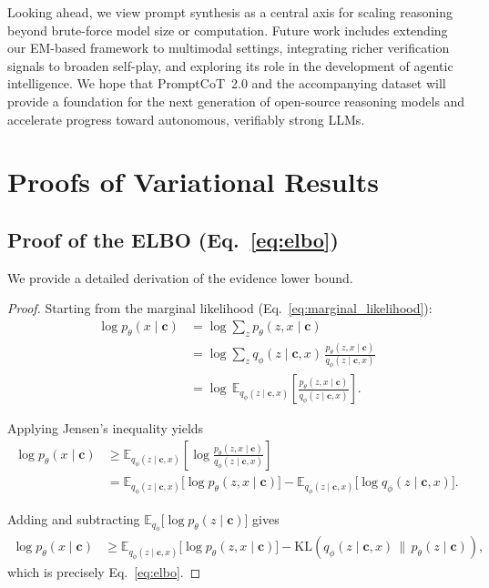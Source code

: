   Looking ahead, we view prompt synthesis as a central axis for scaling reasoning beyond brute-force model size or computation.  
  Future work includes extending our EM-based framework to multimodal settings, integrating richer verification signals to broaden self-play, and exploring its role in the development of agentic intelligence.  
  We hope that PromptCoT~2.0 and the accompanying dataset will provide a foundation for the next generation of open-source reasoning models and accelerate progress toward autonomous, verifiably strong LLMs.
  
  \appendix
  \section{Proofs of Variational Results}
  \label{app:proofs}
  
  \subsection{Proof of the ELBO (Eq.~\ref{eq:elbo})}
  We provide a detailed derivation of the evidence lower bound.
  
  \begin{proof}
  Starting from the marginal likelihood (Eq.~\ref{eq:marginal_likelihood}):
  \begin{align*}
  \log p_\theta(x \mid \mathbf{c})
  &= \log \sum_{z} p_\theta(z, x \mid \mathbf{c}) \\
  &= \log \sum_{z} q_\phi(z \mid \mathbf{c}, x) \, \frac{p_\theta(z, x \mid \mathbf{c})}{q_\phi(z \mid \mathbf{c}, x)} \\
  &= \log \, \mathbb{E}_{q_\phi(z \mid \mathbf{c}, x)} \!\left[ \frac{p_\theta(z, x \mid \mathbf{c})}{q_\phi(z \mid \mathbf{c}, x)} \right].
  \end{align*}
  
  Applying Jensen’s inequality yields
  \begin{align*}
  \log p_\theta(x \mid \mathbf{c})
  &\geq \mathbb{E}_{q_\phi(z \mid \mathbf{c}, x)} \!\left[ \log \frac{p_\theta(z, x \mid \mathbf{c})}{q_\phi(z \mid \mathbf{c}, x)} \right] \\
  &= \mathbb{E}_{q_\phi(z \mid \mathbf{c}, x)} \!\big[\log p_\theta(z, x \mid \mathbf{c})\big] 
  - \mathbb{E}_{q_\phi(z \mid \mathbf{c}, x)} \!\big[\log q_\phi(z \mid \mathbf{c}, x)\big].
  \end{align*}
  
  Adding and subtracting $\mathbb{E}_{q_\phi}\big[\log p_\theta(z \mid \mathbf{c})\big]$ gives
  \begin{align*}
  \log p_\theta(x \mid \mathbf{c})
  &\geq \mathbb{E}_{q_\phi(z \mid \mathbf{c}, x)} \!\big[\log p_\theta(z, x \mid \mathbf{c})\big] 
  - \mathrm{KL}\!\left(q_\phi(z \mid \mathbf{c}, x)\,\|\,p_\theta(z \mid \mathbf{c})\right),
  \end{align*}
  which is precisely Eq.~\ref{eq:elbo}.
  \end{proof}
  
